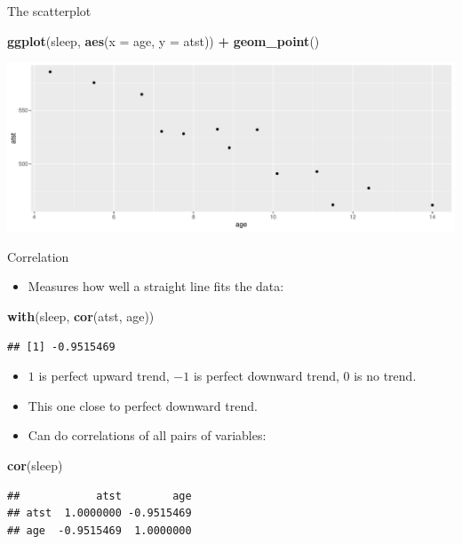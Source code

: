 \documentclass[
  ignorenonframetext,
]{beamer}
\newenvironment{Shaded}{\begin{snugshade}}{\end{snugshade}}
\newcommand{\DataTypeTok}[1]{\textcolor[rgb]{0.13,0.29,0.53}{#1}}
\newcommand{\KeywordTok}[1]{\textcolor[rgb]{0.13,0.29,0.53}{\textbf{#1}}}
\newcommand{\NormalTok}[1]{#1}
\newcommand{\OperatorTok}[1]{\textcolor[rgb]{0.81,0.36,0.00}{\textbf{#1}}}
\newcommand{\StringTok}[1]{\textcolor[rgb]{0.31,0.60,0.02}{#1}}
\providecommand{\tightlist}{%
  \setlength{\itemsep}{0pt}\setlength{\parskip}{0pt}}
\begin{document}
\begin{frame}[fragile]{The scatterplot}
\protect\hypertarget{the-scatterplot}{}

\begin{Shaded}
\begin{Highlighting}[]
\KeywordTok{ggplot}\NormalTok{(sleep, }\KeywordTok{aes}\NormalTok{(}\DataTypeTok{x =}\NormalTok{ age, }\DataTypeTok{y =}\NormalTok{ atst)) }\OperatorTok{+}\StringTok{ }\KeywordTok{geom_point}\NormalTok{()}
\end{Highlighting}
\end{Shaded}

\includegraphics{slides_d29_files/figure-beamer/suggo-1.pdf}

\end{frame}

\begin{frame}[fragile]{Correlation}
\protect\hypertarget{correlation}{}

\begin{itemize}
\tightlist
\item
  Measures how well a straight line fits the data:
\end{itemize}

\begin{Shaded}
\begin{Highlighting}[]
\KeywordTok{with}\NormalTok{(sleep, }\KeywordTok{cor}\NormalTok{(atst, age))}
\end{Highlighting}
\end{Shaded}

\begin{verbatim}
## [1] -0.9515469
\end{verbatim}

\begin{itemize}
\item
  \(1\) is perfect upward trend, \(-1\) is perfect downward trend, 0 is
  no trend.
\item
  This one close to perfect downward trend.
\item
  Can do correlations of all pairs of variables:
\end{itemize}

\begin{Shaded}
\begin{Highlighting}[]
\KeywordTok{cor}\NormalTok{(sleep)}
\end{Highlighting}
\end{Shaded}

\begin{verbatim}
##            atst        age
## atst  1.0000000 -0.9515469
## age  -0.9515469  1.0000000
\end{verbatim}

\end{frame}
\end{document}
